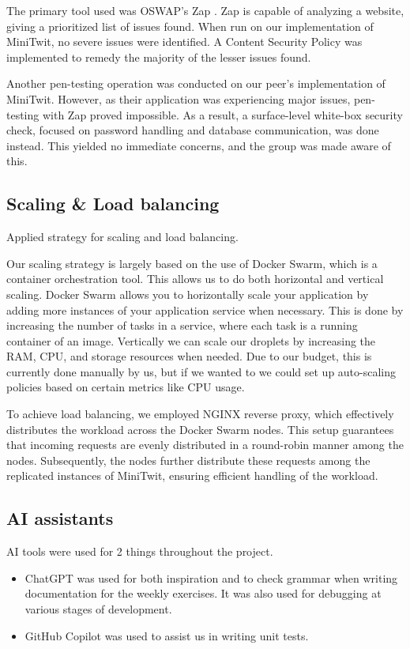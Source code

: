 The primary tool used was OSWAP's Zap %
. Zap is capable of analyzing a website, giving a prioritized list of issues found. When run on our implementation of MiniTwit, no severe issues were identified. A Content Security Policy was implemented to remedy the majority of the lesser issues found.

Another pen-testing operation was conducted on our peer's implementation of MiniTwit. However, as their application was experiencing major issues, pen-testing with Zap proved impossible. As a result, a surface-level white-box security check, focused on password handling and database communication, was done instead. This yielded no immediate concerns, and the group was made aware of this.

\subsection{Scaling \& Load balancing}
Applied strategy for scaling and load balancing.

Our scaling strategy is largely based on the use of Docker Swarm, which is a container orchestration tool. This allows us to do both horizontal and vertical scaling. Docker Swarm allows you to horizontally scale your application by adding more instances of your application service when necessary. This is done by increasing the number of tasks in a service, where each task is a running container of an image. Vertically we can scale our droplets by increasing the RAM, CPU, and storage resources when needed. Due to our budget, this is currently done manually by us, but if we wanted to we could set up auto-scaling policies based on certain metrics like CPU usage.

To achieve load balancing, we employed NGINX reverse proxy, which effectively distributes the workload across the Docker Swarm nodes. This setup guarantees that incoming requests are evenly distributed in a round-robin manner among the nodes. Subsequently, the nodes further distribute these requests among the replicated instances of MiniTwit, ensuring efficient handling of the workload.

\subsection{AI assistants}
AI tools were used for 2 things throughout the project.
\begin{itemize}
    \item ChatGPT 
    was used for both inspiration and to check grammar when writing documentation for the weekly exercises. It was also used for debugging at various stages of development. 
    \item GitHub Copilot %
    was used to assist us in writing unit tests.
\end{itemize}